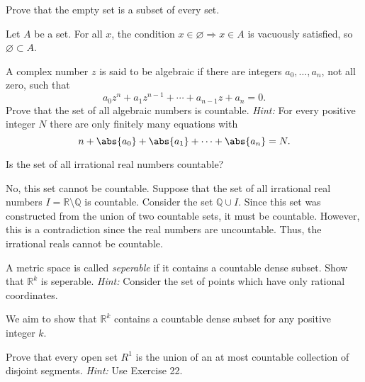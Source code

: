 \documentclass{zupan}
\begin{document}
\begin{exercise}{1}
  Prove that the empty set is a subset of every set.
\end{exercise}

\begin{solution}
  Let $A$ be a set. For all $x$, the condition $x \in \varnothing \Rightarrow x
  \in A$ is vacuously satisfied, so $\varnothing \subset A$.
\end{solution}

\begin{exercise}{2}
  A complex number $z$ is said to be algebraic if there are integers $a_0 ,
  \dots, a_n$, not all zero, such that \[a_0z^n + a_1z^{n - 1} + \cdots + a_{n
  - 1}z + a_n = 0.\] Prove that the set of all algebraic numbers is countable.
  \textit{Hint:} For every positive integer $N$ there are only finitely many
  equations with \[n + \abs{a_0} + \abs{a_1} + \cdots + \abs{a_n} = N.\]
\end{exercise}

\begin{exercise}{4}
  Is the set of all irrational real numbers countable?
\end{exercise}

\begin{solution}
  No, this set cannot be countable. Suppose that the set of all irrational real
  numbers $I = \mathbb{R} \setminus \mathbb{Q}$ is countable. Consider the set
  $\mathbb{Q} \cup I$. Since this set was constructed from the union of two
  countable sets, it must be countable. However, this is a contradiction since
  the real numbers are uncountable. Thus, the irrational reals cannot be
  countable.
\end{solution}

\begin{exercise}{22}
  A metric space is called \textit{seperable} if it contains a countable dense
  subset. Show that \(\mathbb{R}^k\) is seperable. \textit{Hint:} Consider the
  set of points which have only rational coordinates.
\end{exercise}

\begin{solution}
  We aim to show that \(\mathbb{R}^k\) contains a countable dense subset for
  any positive integer \(k\).
\end{solution}

\begin{exercise}{29}
  Prove that every open set \(R^1\) is the union of an at most countable
  collection of disjoint segments. \textit{Hint:} Use Exercise 22.
\end{exercise}
\end{document}
